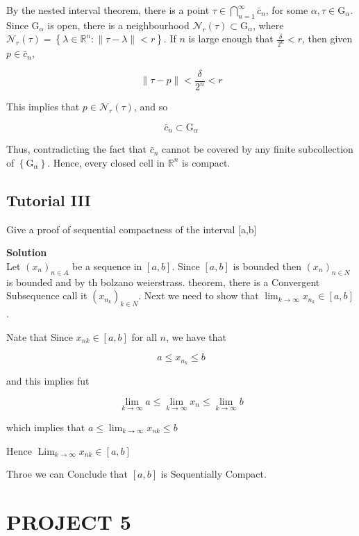 \documentclass{article}
\begin{document}
By the nested interval theorem, there is a point $\tau \in \bigcap_{n=1}^{\infty} \bar{c}_{n}$, for some $\alpha, \tau \in \mathrm{G}_{\alpha}$. Since $\mathrm{G}_{\alpha}$ is open, there is a neighbourhood $\mathcal{N}_{r}(\tau) \subset \mathrm{G}_{\alpha}$, where $\mathcal{N}_{r}(\tau)=\left\{\lambda \in \mathbb{R}^{n}:\|\tau-\lambda\|<r\right\}$. If $n$ is large enough that $\frac{\delta}{2^{n}}<r$, then given $p \in \bar{c}_{n}$,

$$
\|\tau-p\|<\frac{\delta}{2^{n}}<r
$$

This implies that $p \in \mathcal{N}_{r}(\tau)$, and so

$$
\bar{c}_{n} \subset \mathrm{G}_{\alpha}
$$

Thus, contradicting the fact that $\bar{c}_{n}$ cannot be covered by any finite subcollection of $\left\{\mathrm{G}_{\alpha}\right\}$. Hence, every closed cell in $\mathbb{R}^{n}$ is compact.

\subsection{Tutorial III}

Give a proof of sequential compactness of the interval [a,b]

\textbf{Solution}\\

Let $\left(x_{n}\right)_{n \in A}$ be a sequence in $[a, b]$. Since $[a, b]$ is bounded then $\left(x_{n}\right)_{n \in N}$ is bounded and by th bolzano weierstrass. theorem, there is a Convergent Subsequence call it $\left(x_{n_{k}}\right)_{k \in N}$. Next we need to show that $\lim _{k \rightarrow \infty} x_{n_{k}} \in[a, b]$.

Nate that Since $x_{n k} \in[a, b]$ for all $n$, we have that

$$
a \leqslant x_{n_{k}} \leqslant b
$$

and this implies fut

$$
\lim _{k \rightarrow \infty} a \leq \lim _{k \rightarrow \infty} x_{n} \leq \lim _{k \rightarrow \infty} b
$$

which implies that $a \leq \lim _{k \rightarrow \infty} x_{n k} \leq b$

Hence $\operatorname{Lim}_{k \rightarrow \infty} x_{n k} \in[a, b]$

Throe we can Conclude that $[a, b]$ is Sequentially Compact.
\section{PROJECT 5}
\end{document}
